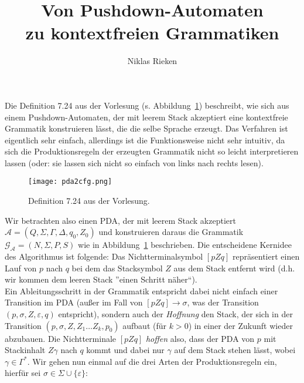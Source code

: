 \documentclass[11pt, a4paper]{article}
\author{Niklas Rieken}
\title{Von Pushdown-Automaten\\zu kontextfreien Grammatiken}
\theoremstyle{definition}
\theoremstyle{plain}
\begin{document}
\maketitle
Die Definition 7.24 aus der Vorlesung (s. Abbildung~\ref{fig:pda2cfg}) beschreibt, wie sich aus einem Pushdown-Automaten, der mit leerem Stack akzeptiert eine kontextfreie Grammatik konstruieren lässt, die die selbe Sprache erzeugt. Das Verfahren ist eigentlich sehr einfach, allerdings ist die Funktionsweise nicht sehr intuitiv, da sich die Produktionsregeln der erzeugten Grammatik nicht so leicht interpretieren lassen (oder: sie lassen sich nicht so einfach von links nach rechts lesen).\par
\begin{figure}
	\centering
	\texttt{[image: pda2cfg.png]}
	\caption{Definition 7.24 aus der Vorlesung.}
	\label{fig:pda2cfg}
\end{figure}
Wir betrachten also einen PDA, der mit leerem Stack akzeptiert \( \mathcal{A} = (Q, \Sigma, \Gamma, \Delta, q_0, Z_0) \) und konstruieren daraus die Grammatik \( \mathcal{G_A} = (N, \Sigma, P, S) \) wie in Abbildung~\ref{fig:pda2cfg} beschrieben. Die entscheidene Kernidee des Algorithmus ist folgende: Das Nichtterminalsymbol \( [pZq] \) repräsentiert einen Lauf von \( p \) nach \( q \) bei dem das Stacksymbol \( Z \) aus dem Stack entfernt wird (d.h. wir kommen dem leeren Stack ''einen Schritt näher``).\\
Ein Ableitungsschritt in der Grammatik entspricht dabei nicht einfach einer Transition im PDA (außer im Fall von \( [pZq] \to \sigma \), was der Transition \( (p, \sigma, Z, \varepsilon, q) \) entspricht), sondern auch der \textit{Hoffnung} den Stack, der sich in der Transition \( (p, \sigma, Z, Z_1 \ldots Z_k, p_0) \) aufbaut (für \( k > 0 \)) in einer der Zukunft wieder abzubauen. Die Nichtterminale \( [pZq] \) \textit{hoffen} also, dass der PDA von \( p \) mit Stackinhalt \( Z\gamma \) nach \( q \) kommt und dabei nur \( \gamma \) auf dem Stack stehen lässt, wobei \( \gamma \in \Gamma^\ast \). Wir gehen nun einmal auf die drei Arten der Produktionsregeln ein, hierfür sei \( \sigma \in \Sigma \cup \{ \varepsilon \} \):
\end{document}
